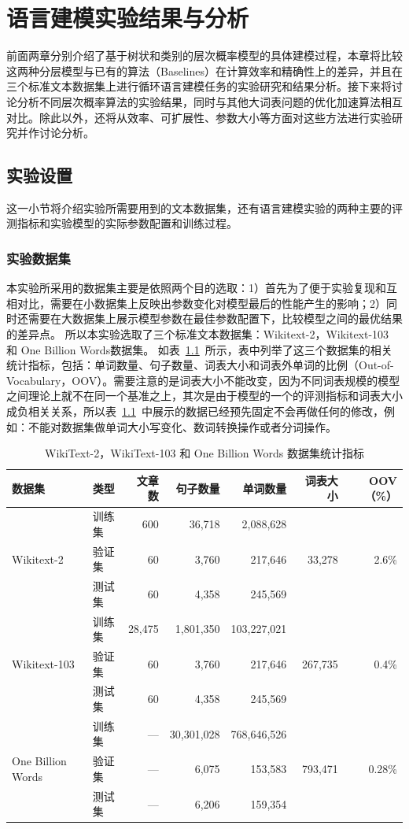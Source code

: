 
\chapter{语言建模实验结果与分析}
前面两章分别介绍了基于树状和类别的层次概率模型的具体建模过程，本章将比较这两种分层模型与已有的算法（Baselines）在计算效率和精确性上的差异，并且在三个标准文本数据集上进行循环语言建模任务的实验研究和结果分析。接下来将讨论分析不同层次概率算法的实验结果，同时与其他大词表问题的优化加速算法相互对比。除此以外，还将从效率、可扩展性、参数大小等方面对这些方法进行实验研究并作讨论分析。

\section{实验设置}
这一小节将介绍实验所需要用到的文本数据集，还有语言建模实验的两种主要的评测指标和实验模型的实际参数配置和训练过程。
\subsection{实验数据集}
本实验所采用的数据集主要是依照两个目的选取：1）首先为了便于实验复现和互相对比，需要在小数据集上反映出参数变化对模型最后的性能产生的影响；2）同时还需要在大数据集上展示模型参数在最佳参数配置下，比较模型之间的最优结果的差异点。
所以本实验选取了三个标准文本数据集：Wikitext-2，Wikitext-103 和 One Billion Words数据集。
如表~\ref{tab:dataset}~所示，表中列举了这三个数据集的相关统计指标，包括：单词数量、句子数量、词表大小和词表外单词的比例（Out-of-Vocabulary，OOV）。需要注意的是词表大小不能改变，因为不同词表规模的模型之间理论上就不在同一个基准之上，其次是由于模型的一个的评测指标和词表大小成负相关关系，所以表~\ref{tab:dataset}~中展示的数据已经预先固定不会再做任何的修改，例如：不能对数据集做单词大小写变化、数词转换操作或者分词操作。
\begin{table}[!ht]
  \centering
  \caption{WikiText-2，WikiText-103 和 One Billion Words 数据集统计指标 \label{tab:dataset}}
\begin{tabular}{llrrrrr}
\toprule
数据集& 类型& 文章数 & 句子数量 & 单词数量 & 词表大小 & OOV（\%） \\ \midrule
\multirow{3}{*}{Wikitext-2} &训练集& 600 & 36,718 & 2,088,628 & \multirow{3}{*}{33,278} & \multirow{3}{*}{2.6\%} \\
&验证集& 60 &3,760 & 217,646  & &\\
&测试集& 60 & 4,358 & 245,569 & &\\
\midrule
\multirow{3}{*}{Wikitext-103} &训练集& 28,475 &  1,801,350 &  103,227,021 & \multirow{3}{*}{267,735} & \multirow{3}{*}{0.4\%} \\
&验证集& 60 &3,760 & 217,646  & &\\
&测试集& 60 & 4,358 & 245,569 & &\\
\midrule
\multirow{3}{*}{One Billion Words} &训练集& --- &30,301,028&768,646,526&   \multirow{3}{*}{793,471} &   \multirow{3}{*}{0.28\%} \\
 &验证集& --- &  6,075 &   153,583 &&\\
 &测试集 & --- &  6,206 &   159,354 &&\\
\bottomrule
\end{tabular}
\end{table}

